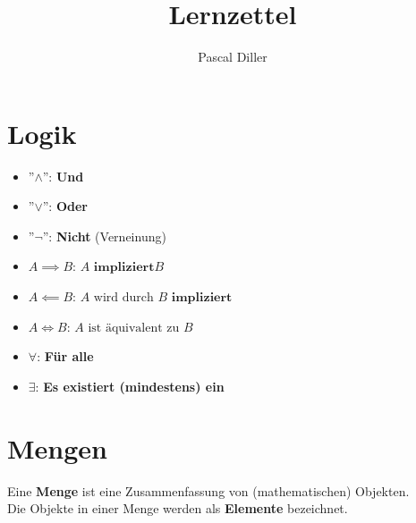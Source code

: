 \documentclass[12pt]{article}
\title{Lernzettel}
\author{Pascal Diller}
\begin{document}
\maketitle
\newpage

\tableofcontents

\newpage
\section{Logik}
\begin{itemize}
    \item ''$\land$'': \textbf{Und}
    \item ''$\lor$'': \textbf{Oder}
    \item ''$\lnot$'': \textbf{Nicht} (Verneinung)
    \item $A \implies B$: $A \textbf{ impliziert} B$
    \item $A \impliedby B$: $A \text{ wird durch } B \textbf{ impliziert}$
    \item $A \Longleftrightarrow  B$: $A \text{ ist äquivalent zu } B$
    \item $\forall$: \textbf{Für alle}
    \item $\exists$: \textbf{Es existiert (mindestens) ein}
\end{itemize}

\section{Mengen}
Eine \textbf{Menge} ist eine Zusammenfassung von (mathematischen) Objekten. \\
Die Objekte in einer Menge werden als \textbf{Elemente} bezeichnet.
 
\end{document}
